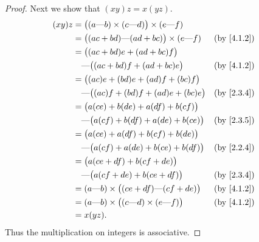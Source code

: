 \begin{proof}
  Next we show that \((xy)z = x(yz)\).
  \begin{align*}
    (xy)z & = \big((a \text{---} b) \times (c \text{---} d)\big) \times (e \text{---} f)                               \\
          & = \big((ac + bd) \text{---} (ad + bc)\big) \times (e \text{---} f)           &  & \text{(by \cref{4.1.2})} \\
          & = \big((ac + bd)e + (ad + bc)f\big)                                                                        \\
          & \quad \text{---} \big((ac + bd)f + (ad + bc)e\big)                           &  & \text{(by \cref{4.1.2})} \\
          & = \big((ac)e + (bd)e + (ad)f + (bc)f\big)                                                                  \\
          & \quad \text{---} \big((ac)f + (bd)f + (ad)e + (bc)e\big)                     &  & \text{(by \cref{2.3.4})} \\
          & = \big(a(ce) + b(de) + a(df) + b(cf)\big)                                                                  \\
          & \quad \text{---} \big(a(cf) + b(df) + a(de) + b(ce)\big)                     &  & \text{(by \cref{2.3.5})} \\
          & = \big(a(ce) + a(df) + b(cf) + b(de)\big)                                                                  \\
          & \quad \text{---} \big(a(cf) + a(de) + b(ce) + b(df)\big)                     &  & \text{(by \cref{2.2.4})} \\
          & = \big(a(ce + df) + b(cf + de)\big)                                                                        \\
          & \quad \text{---} \big(a(cf + de) + b(ce + df)\big)                           &  & \text{(by \cref{2.3.4})} \\
          & = (a \text{---} b) \times \big((ce + df) \text{---} (cf + de)\big)           &  & \text{(by \cref{4.1.2})} \\
          & = (a \text{---} b) \times \big((c \text{---} d) \times (e \text{---} f)\big) &  & \text{(by \cref{4.1.2})} \\
          & = x(yz).
  \end{align*}
  Thus the multiplication on integers is associative.


\end{proof}
